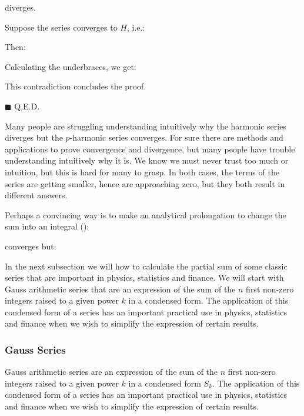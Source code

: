 	diverges.
	\begin{dem}
		Suppose the series converges to $H$, i.e.:
		
		Then:
		
		Calculating the underbraces, we get:
		
		This contradiction concludes the proof.	
		\begin{flushright}
			$\blacksquare$  Q.E.D.
		\end{flushright}
	\end{dem}
	\begin{tcolorbox}[title=Remark,colframe=black,arc=10pt]
	Many people are struggling understanding intuitively why the harmonic series diverges but the $p$-harmonic series converges. For sure there are methods and applications to prove convergence and divergence, but many people have trouble understanding intuitively why it is. We know we must never trust too much or intuition, but this is hard for many to grasp. In both cases, the terms of the series are getting smaller, hence are approaching zero, but they both result in different answers.
	
	Perhaps a convincing way is to make an analytical prolongation to change the sum into an integral ():
	
	converges but:
	
	\end{tcolorbox}
	
	In the next subsection we will how to calculate the partial sum of some classic series that are important in physics, statistics and finance. We will start with Gauss arithmetic series that are an expression of the sum of the $n$ first non-zero integers raised to a given power $k$ in a condensed form. The application of this condensed form of a series has an important practical use in physics, statistics and finance when we wish to simplify the expression of certain results.
	
	\subsubsection{Gauss Series}\label{gauss series}
	
	Gauss arithmetic series are an expression of the sum of the $n$ first non-zero integers raised to a given power $k$ in a condensed form $S_k$. The application of this condensed form of a series has an important practical use in physics, statistics and finance when we wish to simplify the expression of certain results.
	

